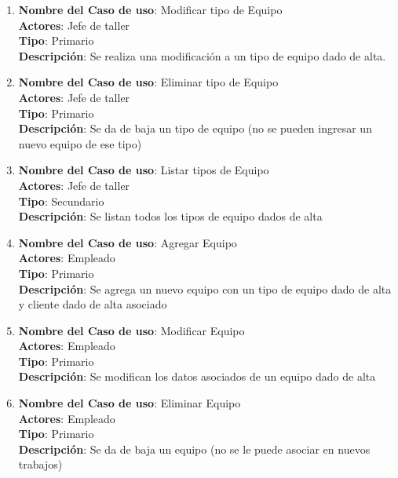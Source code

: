 \documentclass[12pt]{extarticle}
\begin{document}
\begin{spacing}{1.2}
\begin{enumerate}
            \item 	\textbf{Nombre del Caso de uso}: Modificar tipo de Equipo\\
                    \textbf{Actores}: Jefe de taller\\
                    \textbf{Tipo}: Primario\\
                    \textbf{Descripción}: Se realiza una modificación a un tipo de equipo dado de alta.
            
            \item 	\textbf{Nombre del Caso de uso}: Eliminar tipo de Equipo\\
                    \textbf{Actores}: Jefe de taller\\
                    \textbf{Tipo}: Primario\\
                    \textbf{Descripción}: Se da de baja un tipo de equipo (no se pueden ingresar un nuevo equipo de ese tipo)
            
            \item 	\textbf{Nombre del Caso de uso}: Listar tipos de Equipo\\
                    \textbf{Actores}: Jefe de taller\\
                    \textbf{Tipo}: Secundario\\
                    \textbf{Descripción}: Se listan todos los tipos de equipo dados de alta
            
            \item 	\textbf{Nombre del Caso de uso}: Agregar Equipo\\
                    \textbf{Actores}: Empleado\\
                    \textbf{Tipo}: Primario\\
                    \textbf{Descripción}: Se agrega un nuevo equipo con un tipo de equipo dado de alta y cliente dado de alta asociado
            
            \item 	\textbf{Nombre del Caso de uso}: Modificar Equipo\\
                    \textbf{Actores}: Empleado\\
                    \textbf{Tipo}: Primario\\
                    \textbf{Descripción}: Se modifican los datos asociados de un equipo dado de alta
            
            \item 	\textbf{Nombre del Caso de uso}: Eliminar Equipo\\
                    \textbf{Actores}: Empleado\\
                    \textbf{Tipo}: Primario\\
                    \textbf{Descripción}: Se da de baja un equipo (no se le puede asociar en nuevos trabajos)
            

\end{enumerate}
\end{spacing}
\end{document}
